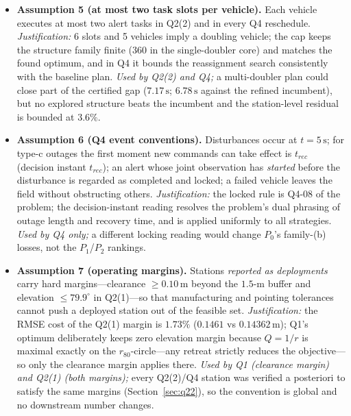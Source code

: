 \begin{itemize}
error is linearized as $\Delta\psi_{loc}\approx\delta_\perp/r$ (radians), and the
$\pm180^\circ$ wrap has negligible effect on the $\pm5^\circ$ reliability event.
\emph{Justification:} the arctan cubic term and denominator perturbation have one-sigma
relative scales $0.0559\%$ and $4.0961\%$, respectively; exact-geometry Monte Carlo
differs from the analytic sweep by at most $0.18$ percentage points, and the linearized
wrap tail at $s=80\,\mathrm{m}$ underflows in double precision. \emph{Used by Q3 only;}
full \texttt{atan2} quadrature puts the crossing at $66.8373\,\mathrm{m}$, so the
linearized cap is non-conservative by $0.0850\,\mathrm{m}$. At $r=40\,\mathrm{m}$,
the rounded-down limit is $66.83\,\mathrm{m}$ (Section~\ref{sec:q3}).
\item \textbf{Assumption 5 (at most two task slots per vehicle).} Each vehicle executes
at most two alert tasks in Q2(2) and in every Q4 reschedule. \emph{Justification:} 6
slots and 5 vehicles imply a doubling vehicle; the cap keeps the structure family
finite (360 in the single-doubler core) and matches the found optimum, and in Q4 it
bounds the reassignment search consistently with the baseline plan. \emph{Used by
Q2(2) and Q4;} a multi-doubler plan could close part of the certified gap
($7.17\,\mathrm{s}$; $6.78\,\mathrm{s}$ against the refined incumbent), but no explored
structure beats the incumbent and the station-level residual is bounded at $3.6\%$.
\item \textbf{Assumption 6 (Q4 event conventions).} Disturbances occur at
$t=5\,\mathrm{s}$; for type-c outages the first moment new commands can take effect is
$t_{rec}$ (decision instant $t_{rec}$); an alert whose joint observation has
\emph{started} before the disturbance is regarded as completed and locked; a failed
vehicle leaves the field without obstructing others. \emph{Justification:} the locked
rule is Q4-08 of the problem; the decision-instant reading resolves the problem's dual
phrasing of outage length and recovery time, and is applied uniformly to all strategies.
\emph{Used by Q4 only;} a different locking reading would change $P_0$'s family-(b)
losses, not the $P_1$/$P_2$ rankings.
\item \textbf{Assumption 7 (operating margins).} Stations
\emph{reported as deployments} carry hard margins---clearance
$\ge0.10\,\mathrm{m}$ beyond the $1.5$-m buffer and elevation $\le79.9^\circ$ in
Q2(1)---so that manufacturing and pointing tolerances cannot push a deployed station
out of the feasible set. \emph{Justification:} the RMSE cost of the Q2(1) margin is
$1.73\%$ ($0.1461$ vs $0.14362\,\mathrm{m}$); Q1's optimum deliberately keeps zero
elevation margin because $Q=1/r$ is maximal exactly on the $r_{80}$-circle---any
retreat strictly reduces the objective---so only the clearance margin applies there.
\emph{Used by Q1 (clearance margin) and Q2(1) (both margins);} every Q2(2)/Q4 station
was verified a posteriori to satisfy the same margins (Section~\ref{sec:q22}), so the
convention is global and no downstream number changes.
\end{itemize}
